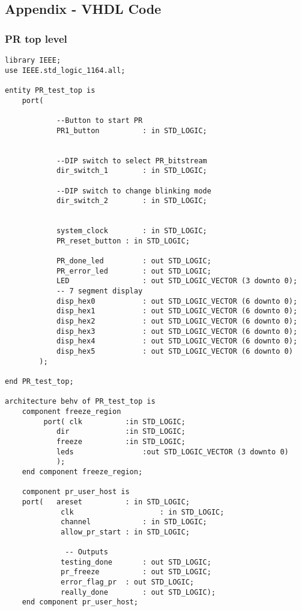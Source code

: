 \subsection{Appendix - VHDL Code}
\subsubsection{PR top level}
\begin{lstlisting}[style=vhdl]
library IEEE;
use IEEE.std_logic_1164.all; 

entity PR_test_top is
    port( 
     
            --Button to start PR
            PR1_button          : in STD_LOGIC;

            
            --DIP switch to select PR_bitstream
            dir_switch_1        : in STD_LOGIC;
            
            --DIP switch to change blinking mode 
            dir_switch_2        : in STD_LOGIC;
            
            
            system_clock        : in STD_LOGIC;
            PR_reset_button : in STD_LOGIC;
            
            PR_done_led         : out STD_LOGIC; 
            PR_error_led        : out STD_LOGIC;            
            LED                 : out STD_LOGIC_VECTOR (3 downto 0);
            -- 7 segment display
            disp_hex0           : out STD_LOGIC_VECTOR (6 downto 0);  
            disp_hex1           : out STD_LOGIC_VECTOR (6 downto 0);
            disp_hex2           : out STD_LOGIC_VECTOR (6 downto 0);
            disp_hex3           : out STD_LOGIC_VECTOR (6 downto 0);
            disp_hex4           : out STD_LOGIC_VECTOR (6 downto 0);
            disp_hex5           : out STD_LOGIC_VECTOR (6 downto 0)
        );
            
end PR_test_top;

architecture behv of PR_test_top is
    component freeze_region
         port( clk          :in STD_LOGIC;
            dir             :in STD_LOGIC;       
            freeze          :in STD_LOGIC;
            leds                :out STD_LOGIC_VECTOR (3 downto 0)
            );
    end component freeze_region;
     
    component pr_user_host is
    port(   areset          : in STD_LOGIC;
             clk                    : in STD_LOGIC;
             channel            : in STD_LOGIC;
             allow_pr_start : in STD_LOGIC;

              -- Outputs
             testing_done       : out STD_LOGIC; 
             pr_freeze          : out STD_LOGIC; 
             error_flag_pr  : out STD_LOGIC; 
             really_done        : out STD_LOGIC);
    end component pr_user_host;
    

\end{lstlisting}
